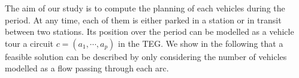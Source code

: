\begin{bibunit}[ieeetr]
%
%
%
%

The aim of our study is to compute the planning of each vehicles during the period. 
At any time, each of them is either parked in a station or in transit between two stations.
Its position over the period can be modelled as a vehicle tour \ie a circuit $c=(a_1,\cdots, a_p)$ in the TEG.
We show in the following that a feasible solution can be described by only considering the number of vehicles modelled as a flow passing through each arc.


\end{bibunit}
